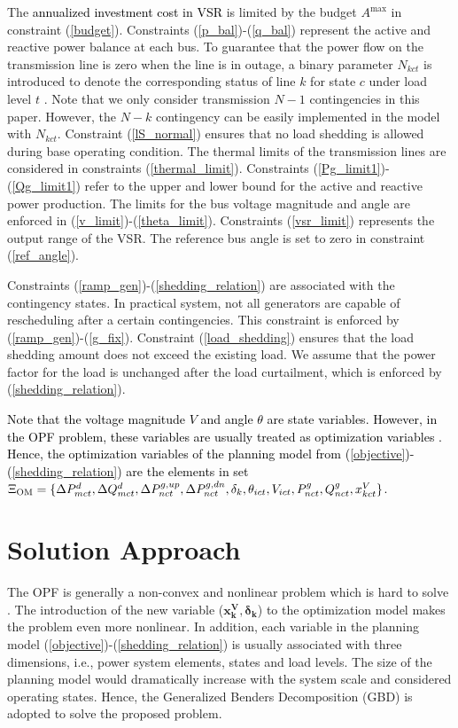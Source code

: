 \documentclass[journal]{IEEEtran}
\newcommand{\splitatcommas}[1]{%
	\begingroup
	\begingroup\lccode`~=`, \lowercase{\endgroup
		\edef~{\mathchar\the\mathcode`, \penalty0 \noexpand\hspace{0pt plus 1em}}%
	}\mathcode`,="8000 #1%
	\endgroup
}
\begin{document}
The \textcolor{black}{annualized investment cost in VSR} is limited by the budget $A^{\max}$ in constraint (\ref{budget}). Constraints (\ref{p_bal})-(\ref{q_bal}) represent the active and reactive power balance at each bus. To guarantee that the power flow on the transmission line is zero when the line is in outage, a binary parameter $N_{kct}$ is introduced to denote the corresponding status of line $k$ for state $c$ under load level $t$ \cite{mybibb:investment_naps}. Note that we only consider transmission $N-1$ contingencies in this paper. However, the $N-k$ contingency can be easily implemented in the model with $N_{kct}$. Constraint (\ref{lS_normal}) ensures that no load shedding is allowed during base operating condition. The thermal limits of the transmission lines are considered in constraints (\ref{thermal_limit}). Constraints (\ref{Pg_limit1})-(\ref{Qg_limit1}) refer to the upper and lower bound for the active and reactive power production. The limits for the bus voltage magnitude and angle are enforced in (\ref{v_limit})-(\ref{theta_limit}). Constraints (\ref{vsr_limit}) represents the output range of the VSR. The reference bus angle is set to zero in constraint (\ref{ref_angle}).

Constraints (\ref{ramp_gen})-(\ref{shedding_relation}) are associated with the contingency states. In practical system, not all generators are capable of rescheduling after a certain contingencies. This constraint is enforced by (\ref{ramp_gen})-(\ref{g_fix}). Constraint (\ref{load_shedding}) ensures that the load shedding amount does not exceed the existing load. We assume that the power factor for the load is unchanged after the load curtailment, which is enforced by (\ref{shedding_relation}). 

\textcolor{black}{Note that the voltage magnitude $V$ and angle $\theta$ are state variables. However, in the OPF problem, these variables are usually treated as optimization variables \cite{mybibb:tcsc_wind}. Hence, the optimization variables of the planning model from (\ref{objective})-(\ref{shedding_relation}) are the elements in set $\splitatcommas{\Xi_{\text{OM}}=\{\Delta P^d_{mct},\Delta Q^d_{mct},\Delta P^{g,up}_{nct},\Delta P^{g,dn}_{nct},\delta_k,\theta_{ict},V_{ict},P^g_{nct},Q^g_{nct},x_{kct}^V\}}$.}

\section{Solution Approach}
\label{solution_approach}
The OPF is generally a non-convex and nonlinear problem which is hard to solve \cite{mybibb:scuc_dlr}. The introduction of the new variable ($\bm{x_k^V,\delta_k}$) to the optimization model makes the problem even more nonlinear. In addition, each variable in the planning model (\ref{objective})-(\ref{shedding_relation}) is usually associated with three dimensions, i.e., power system elements, states and load levels. The size of the planning model would dramatically increase with the system scale and considered operating states. Hence, the Generalized Benders Decomposition (GBD) \cite{mybibb:tcsc_ac,mybibb:gbd,mybibb:KTH_UC_uncertainty,mybibb:bd_scopf_m} is adopted to solve the proposed problem.
\end{document}
